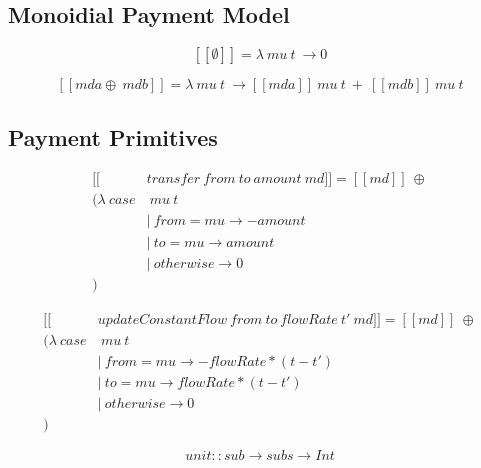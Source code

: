 \documentclass[a4paper,10pt]{report}
\begin{document}
\subsection{Monoidial Payment Model}

\begin{equation}\label{sem_mzero}
    [\![\emptyset]\!] = \lambda\ mu\ t\ \rightarrow 0
\end{equation}

\begin{equation}\label{sem_mappend}
    [\![mda \oplus\ mdb]\!] = \lambda\ mu\ t\ \rightarrow
    [\![mda]\!]\ mu\ t\ +\ [\![mdb]\!]\ mu\ t
\end{equation}

\subsection{Payment Primitives}

\begin{equation}\label{sem_transfer}
    \begin{split}
        [\![&transfer\ from\ to\ amount\ md]\!] = [\![md]\!]\ \oplus \\
        (\lambda\ case&\ mu\ t \\
        &|\ from = mu \rightarrow -amount \\
        &|\ to   = mu \rightarrow amount \\
        &|\ otherwise \rightarrow 0 \\
        )
    \end{split}
\end{equation}

\begin{equation}\label{sem_updateConstantFlow}
    \begin{split}
        [\![&updateConstantFlow\ from\ to\ flowRate\ t'\ md]\!] = [\![md]\!]\ \oplus \\
        (\lambda\ case&\ mu\ t \\
        &|\ from = mu \rightarrow -flowRate * (t - t') \\
        &|\ to   = mu \rightarrow flowRate  * (t - t') \\
        &|\ otherwise \rightarrow 0 \\
        )
    \end{split}
\end{equation}

\begin{equation}
    unit :: sub \rightarrow subs \rightarrow Int
\end{equation}
\end{document}

